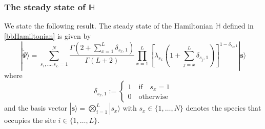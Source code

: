 \documentclass[11pt]{article}
\numberwithin{equation}{section}
\numberwithin{equation}{subsection}
\begin{document}
\subsubsection{The steady state of $\mathbb{H}$}
We state the following result. The steady state of the Hamiltonian $\mathbb{H}$ defined in \eqref{bbHamiltonian} is given by 
\begin{equation}\label{ResulsBasis}
	|\widetilde{\Psi}\rangle=\sum_{s_{1},\ldots,s_{L}=1}^{N}\frac{\Gamma\left(2+\sum_{x=1}^{L}\delta_{s_{x},1}\right)}{\Gamma\left(L+2\right)}\prod_{x=1}^{L}\left[\lambda_{s_{x}}\left(1+\sum_{j=x}^{L}\delta_{s_{j},1}\right)\right]^{1-\delta_{s_{x},1}}|\mathbf{\bm{s}}\rangle
\end{equation}
where 
\begin{equation}
    \delta_{s_{x},1}:=\begin{cases}
        1\quad \text{if}\quad s_{x}=1\\
        0\quad \text{otherwise}
    \end{cases}
\end{equation}
and the basis vector $|\bm{s}\rangle =\bigotimes_{i=1}^{L}|s_{x}\rangle$ with $s_{x}\in\{1,\ldots,N\}$ denotes the species that occupies the site $i\in \{1,\ldots,L\}$.
\end{document}
